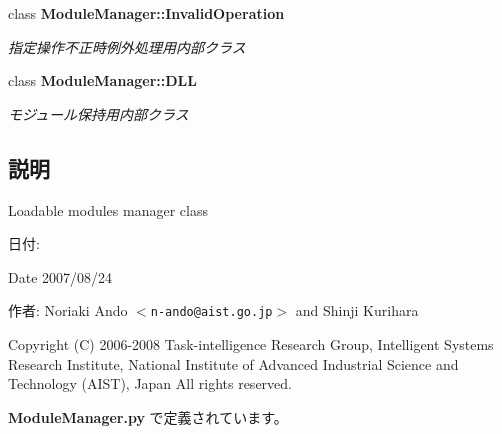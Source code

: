 \begin{CompactItemize}
class {\bf ModuleManager::InvalidOperation}
\begin{CompactList}\small\item\em 指定操作不正時例外処理用内部クラス \item\end{CompactList}\item 
class {\bf ModuleManager::DLL}
\begin{CompactList}\small\item\em モジュール保持用内部クラス \item\end{CompactList}\end{CompactItemize}


\subsection{説明}
Loadable modules manager class 

\begin{Desc}
\item[日付:]\end{Desc}
\begin{Desc}
\item[Date]2007/08/24\end{Desc}
\begin{Desc}
\item[作者:]Noriaki Ando $<${\tt n-ando@aist.go.jp}$>$ and Shinji Kurihara\end{Desc}
Copyright (C) 2006-2008 Task-intelligence Research Group, Intelligent Systems Research Institute, National Institute of Advanced Industrial Science and Technology (AIST), Japan All rights reserved. 

 {\bf ModuleManager.py} で定義されています。